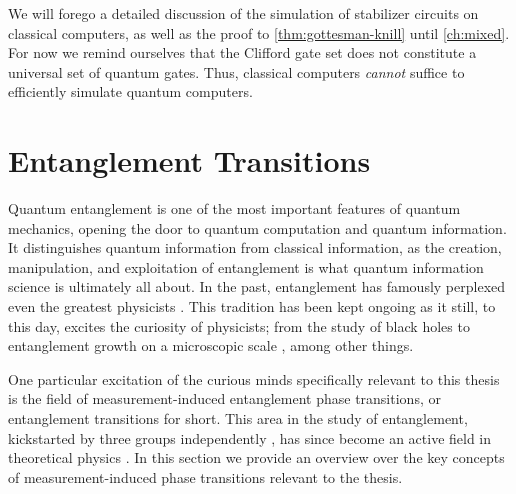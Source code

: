 We will forego a detailed discussion of the simulation of stabilizer circuits
on classical computers, as well as the proof to \cref{thm:gottesman-knill}
until \cref{ch:mixed}. For now we remind ourselves that the Clifford gate set
does not constitute a universal set of quantum gates. Thus, classical computers
\emph{cannot} suffice to efficiently simulate quantum computers.
\clearpage
\section{Entanglement Transitions}\label{sec:ent-trans}

%
%

Quantum entanglement is one of the most important features of quantum
mechanics, opening the door to quantum computation and quantum information.  It
distinguishes quantum information from classical information, as the creation,
manipulation, and exploitation of entanglement is what quantum information
science is ultimately all about.  In the past, entanglement has famously
perplexed even the greatest physicists
\cite{schroedingerGegenwaertigeSituationQuantenmechanik1935,einsteinCanQuantumMechanicalDescription1935}.
This tradition has been kept ongoing as it still, to this day, excites the
curiosity of physicists; from the study of black holes to entanglement growth on
a microscopic scale
\cite{wittenNotesEntanglementProperties2018,nahumQuantumEntanglementGrowth2017},
among other things. 

One particular excitation of the curious minds specifically relevant to this
thesis is the field of measurement-induced entanglement phase transitions, or
entanglement transitions for short. This area in the study of entanglement,
kickstarted by three groups independently
\cite{liQuantumZenoEffect2018,chanUnitaryprojectiveEntanglementDynamics2019,skinnerMeasurementInducedPhaseTransitions2019},
has since become an active field in theoretical physics
\cite{liMeasurementdrivenEntanglementTransition2019,baoTheoryPhaseTransition2020,baoSymmetryEnrichedPhases2021,schmolkeMeasurementinducedQuantumSynchronization2023,hokeMeasurementinducedEntanglementTeleportation2023,nahumMeasurementEntanglementPhase2021,nahumEntanglementDynamicsDiffusionannihilation2020,yoshidaDecodingEntanglementStructure2021}.
In this section we provide an overview over the key concepts of
measurement-induced phase transitions relevant to the thesis.

